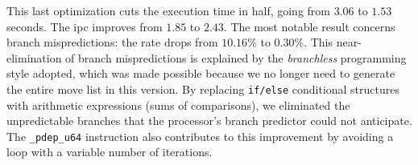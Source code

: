 \documentclass[12pt,a4paper,twoside,openright]{book}
\begin{document}
This last optimization cuts the execution time in half, going from $3.06$ to $1.53$ seconds. The \gls{ipc} improves from $1.85$ to $2.43$. The most notable result concerns branch mispredictions: the rate drops from $10.16\%$ to $0.30\%$. This near-elimination of branch mispredictions is explained by the \emph{branchless} programming style adopted, which was made possible because we no longer need to generate the entire move list in this version. By replacing \texttt{if/else} conditional structures with arithmetic expressions (sums of comparisons), we eliminated the unpredictable branches that the processor's branch predictor could not anticipate. The \texttt{_pdep_u64} instruction also contributes to this improvement by avoiding a loop with a variable number of iterations.






\end{document}
